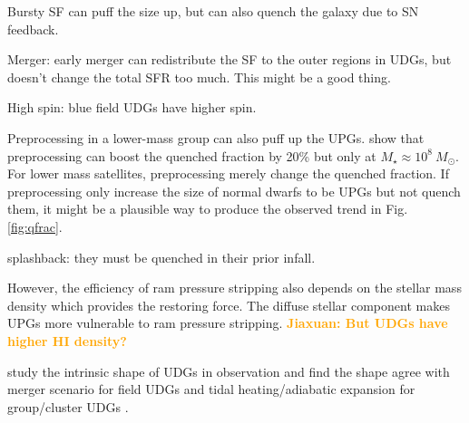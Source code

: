 \documentclass[twocolumn,astrosymb,twocolappendix]{aastex631}
\newcommand{\jiaxuan}[1]{\textcolor{orange}{\textbf{Jiaxuan: #1}}}
\begin{document}
\begin{CJK*}{UTF8}{gbsn}
Bursty SF can puff the size up, but can also quench the galaxy due to SN feedback. 

Merger: early merger can redistribute the SF to the outer regions in UDGs, but doesn't change the total SFR too much. This might be a good thing. 

High spin: blue field UDGs have higher spin.

Preprocessing in a lower-mass group can also puff up the UPGs. \citet{Samuel2022} show that preprocessing can boost the quenched fraction by 20\% but only at $M_\star \approx 10^8\ M_\odot$. For lower mass satellites, preprocessing merely change the quenched fraction. If preprocessing only increase the size of normal dwarfs to be UPGs but not quench them, it might be a plausible way to produce the observed trend in Fig. \ref{fig:qfrac}.

splashback: they must be quenched in their prior infall.


However, the efficiency of ram pressure stripping also depends on the stellar mass density which provides the restoring force. The diffuse stellar component makes UPGs more vulnerable to ram pressure stripping. \jiaxuan{But UDGs have higher HI density?} 


\citet{Kado-Fong2021} study the intrinsic shape of UDGs in observation and find the shape agree with merger scenario for field UDGs \citep{Wright2021} and tidal heating/adiabatic expansion for group/cluster UDGs \citep{Jiang2019,Tremmel2020}. 







\end{CJK*}
\end{document}
